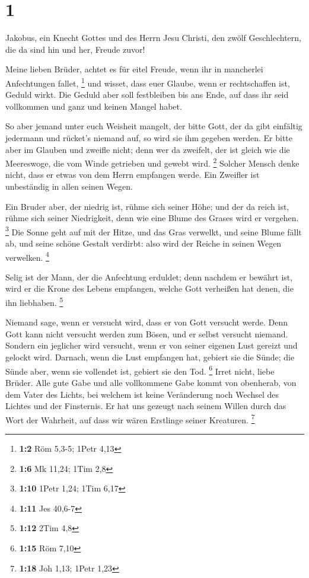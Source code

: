 \hypertarget{section}{%
\section{1}\label{section}}

 Jakobus, ein Knecht Gottes und des Herrn Jesu Christi,
den zwölf Geschlechtern, die da sind hin und her, Freude zuvor!

 Meine lieben Brüder, achtet es für eitel Freude, wenn ihr
in mancherlei Anfechtungen fallet, \footnote{\textbf{1:2} Röm 5,3-5;
  1Petr 4,13}  und wisset, dass euer Glaube, wenn er
rechtschaffen ist, Geduld wirkt.  Die Geduld aber soll
festbleiben bis ans Ende, auf dass ihr seid vollkommen und ganz und
keinen Mangel habet.

 So aber jemand unter euch Weisheit mangelt, der bitte
Gott, der da gibt einfältig jedermann und rücket's niemand auf, so wird
sie ihm gegeben werden.  Er bitte aber im Glauben und
zweifle nicht; denn wer da zweifelt, der ist gleich wie die Meereswoge,
die vom Winde getrieben und gewebt wird. \footnote{\textbf{1:6} Mk
  11,24; 1Tim 2,8}  Solcher Mensch denke nicht, dass er
etwas von dem Herrn empfangen werde.  Ein Zweifler ist
unbeständig in allen seinen Wegen.

 Ein Bruder aber, der niedrig ist, rühme sich seiner Höhe;
 und der da reich ist, rühme sich seiner Niedrigkeit,
denn wie eine Blume des Grases wird er vergehen. \footnote{\textbf{1:10}
  1Petr 1,24; 1Tim 6,17}  Die Sonne geht auf mit der
Hitze, und das Gras verwelkt, und seine Blume fällt ab, und seine schöne
Gestalt verdirbt: also wird der Reiche in seinen Wegen verwelken.
\footnote{\textbf{1:11} Jes 40,6-7}

 Selig ist der Mann, der die Anfechtung erduldet; denn
nachdem er bewährt ist, wird er die Krone des Lebens empfangen, welche
Gott verheißen hat denen, die ihn liebhaben. \footnote{\textbf{1:12}
  2Tim 4,8}

 Niemand sage, wenn er versucht wird, dass er von Gott
versucht werde. Denn Gott kann nicht versucht werden zum Bösen, und er
selbst versucht niemand.  Sondern ein jeglicher wird
versucht, wenn er von seiner eigenen Lust gereizt und gelockt wird.
 Darnach, wenn die Lust empfangen hat, gebiert sie die
Sünde; die Sünde aber, wenn sie vollendet ist, gebiert sie den Tod.
\footnote{\textbf{1:15} Röm 7,10}  Irret nicht, liebe
Brüder.  Alle gute Gabe und alle vollkommene Gabe kommt
von obenherab, von dem Vater des Lichts, bei welchem ist keine
Veränderung noch Wechsel des Lichtes und der Finsternis. 
Er hat uns gezeugt nach seinem Willen durch das Wort der Wahrheit, auf
dass wir wären Erstlinge seiner Kreaturen. \footnote{\textbf{1:18} Joh
  1,13; 1Petr 1,23}

